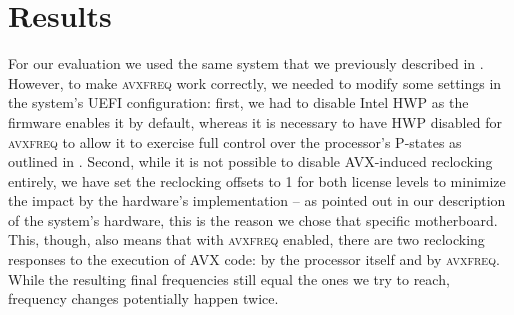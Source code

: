 \begin{figure*}
	\caption{Exemplary run of our staged execution tool when called with \texttt{200~150~400~0~100} as command line. \SI{512}{\bit} \gls{AVX} is executed for a duration of \SI{200}{\micro\second}, then \SI{256}{\bit} \gls{AVX} for \SI{150}{\micro\second}, then purely scalar instructions for \SI{400}{\micro\second}, and finally a last stage with \SI{256}{\bit} \gls{AVX} for another \SI{100}{\micro\second}.}
	\label{fig:evaluation:design:stagedexecution}
\end{figure*}

\section{Results}
\label{sec:evaluation:results}

For our evaluation we used the same system that we previously described in . However, to make \textsc{avxfreq} work correctly, we needed to modify some settings in the system's \gls{UEFI} configuration: first, we had to disable Intel \gls{HWP} as the firmware enables it by default, whereas it is necessary to have \gls{HWP} disabled for \textsc{avxfreq} to allow it to exercise full control over the processor's \glspl{P-state} as outlined in . Second, while it is not possible to disable \gls{AVX}-induced reclocking entirely, we have set the reclocking offsets to 1 for both license levels to minimize the impact by the hardware's implementation -- as pointed out in our description of the system's hardware, this is the reason we chose that specific motherboard. This, though, also means that with \textsc{avxfreq} enabled, there are two reclocking responses to the execution of \gls{AVX} code: by the processor itself and by \textsc{avxfreq}. While the resulting final frequencies still equal the ones we try to reach, frequency changes potentially happen twice.

